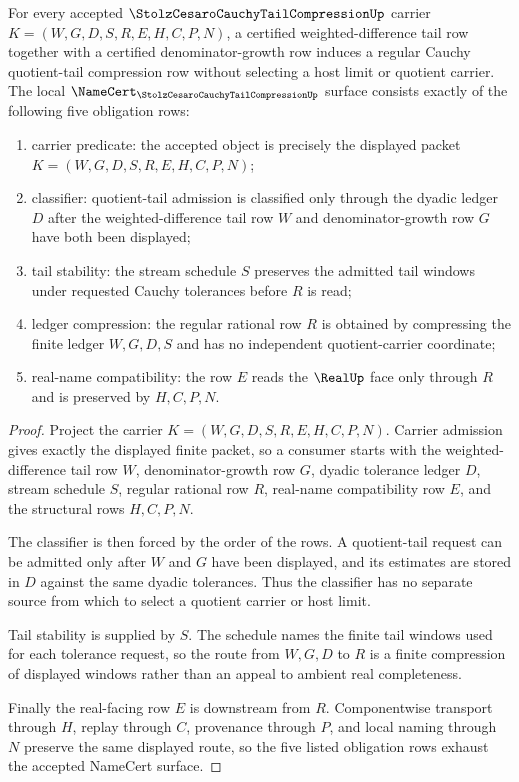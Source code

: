 \begin{theorem}
\label{thm:stolz-cesaro-cauchy-tail-compression}
For every accepted $\StolzCesaroCauchyTailCompressionUp$ carrier $K=(W,G,D,S,R,E,H,C,P,N)$, a certified weighted-difference tail row together with a certified denominator-growth row induces a regular Cauchy quotient-tail compression row without selecting a host limit or quotient carrier. The local $\NameCert_{\StolzCesaroCauchyTailCompressionUp}$ surface consists exactly of the following five obligation rows:
\begin{enumerate}
\item carrier predicate: the accepted object is precisely the displayed packet $K=(W,G,D,S,R,E,H,C,P,N)$;
\item classifier: quotient-tail admission is classified only through the dyadic ledger $D$ after the weighted-difference tail row $W$ and denominator-growth row $G$ have both been displayed;
\item tail stability: the stream schedule $S$ preserves the admitted tail windows under requested Cauchy tolerances before $R$ is read;
\item ledger compression: the regular rational row $R$ is obtained by compressing the finite ledger $W,G,D,S$ and has no independent quotient-carrier coordinate;
\item real-name compatibility: the row $E$ reads the $\RealUp$ face only through $R$ and is preserved by $H,C,P,N$.
\end{enumerate}
\end{theorem}
\begin{proof}
Project the carrier $K=(W,G,D,S,R,E,H,C,P,N)$. Carrier admission gives exactly the displayed finite packet, so a consumer starts with the weighted-difference tail row $W$, denominator-growth row $G$, dyadic tolerance ledger $D$, stream schedule $S$, regular rational row $R$, real-name compatibility row $E$, and the structural rows $H,C,P,N$.

The classifier is then forced by the order of the rows. A quotient-tail request can be admitted only after $W$ and $G$ have been displayed, and its estimates are stored in $D$ against the same dyadic tolerances. Thus the classifier has no separate source from which to select a quotient carrier or host limit.

Tail stability is supplied by $S$. The schedule names the finite tail windows used for each tolerance request, so the route from $W,G,D$ to $R$ is a finite compression of displayed windows rather than an appeal to ambient real completeness.

Finally the real-facing row $E$ is downstream from $R$. Componentwise transport through $H$, replay through $C$, provenance through $P$, and local naming through $N$ preserve the same displayed route, so the five listed obligation rows exhaust the accepted NameCert surface.
\end{proof}

